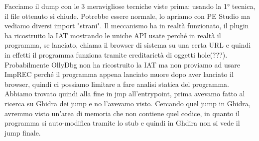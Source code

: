 \documentclass[12pt, oneside]{extbook}
\begin{document}
Facciamo il dump con le 3 meravigliose tecniche viste prima: usando la 1° tecnica, il file ottenuto si chiude. Potrebbe essere normale, lo apriamo con PE Studio ma vediamo diversi import "strani". Il meccanismo ha in realtà funzionato, il plugin ha ricostruito la IAT mostrando le uniche API usate perché in realtà il programma, se lanciato, chiama il browser di sistema su una certa URL e quindi in effetti il programma funziona tramite ereditarietà di oggetti hole(???). Probabilmente OllyDbg non ha ricostruito la IAT ma non proviamo ad usare ImpREC perché il programma appena lanciato muore dopo aver lanciato il browser, quindi ci possiamo limitare a fare analisi statica del programma.\\Abbiamo trovato quindi alla fine in jmp all'entrypoint, prima avevamo fatto al ricerca su Ghidra dei jump e no l'avevamo visto. Cercando quel jump in Ghidra, avremmo visto un'area di memoria che non contiene quel codice, in quanto il programma si auto-modifica tramite lo stub e quindi in Ghdira non si vede il jump finale.
\end{document}
